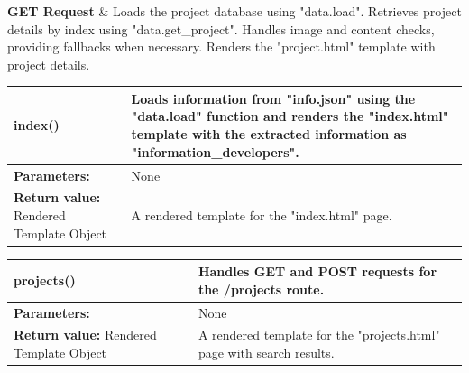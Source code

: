 \documentclass{liu_mall}
\begin{document}
    \textbf{GET Request} & Loads the project database using "data.load".
                    Retrieves project details by index using "data.get\_project".
                    Handles image and content checks, providing fallbacks when necessary.
                    Renders the "project.html" template with project details.\\
            \hline
    \fi
    
    \begin{table}[!h]
        \begin{tabularx}{\textwidth}{p{4.5cm}|p{11.15cm}}
            \hline
            \textbf{index()} &  Loads information from "info.json" using the "data.load" function\newline
                                and renders the "index.html" template with the extracted information\newline
                                as "information\_developers".\\
            \hline
            \textbf{Parameters:} & None \\
            \hline
            \textbf{Return value:}\newline
                Rendered Template Object & A rendered template for the "index.html" page. \\\hline
        \end{tabularx}
    \end{table}
    \vspace{-5mm}
    \begin{table}[!h]
        \begin{tabularx}{\textwidth}{p{4.5cm}|p{11.15cm}}
            \hline
            \textbf{projects()} & Handles GET and POST requests for the /projects route. \\
            \hline
            \textbf{Parameters:} & None\\
            \hline
            \textbf{Return value:}\newline
                Rendered Template Object & A rendered template for the "projects.html" page with search results. \\
            \hline
        \end{tabularx}
    \end{table}
    \vspace{-5mm}
\end{document}
